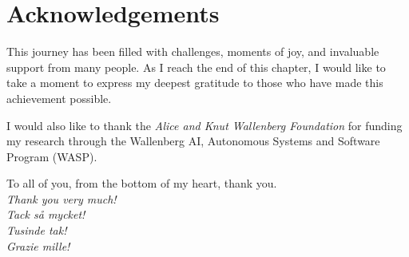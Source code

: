 \chapter{Acknowledgements}
\label{chap:acknowledgements}
This journey has been filled with challenges, moments of joy, and invaluable
support from many people. As I reach the end of this chapter, I would like to
take a moment to express my deepest gratitude to those who have made this
achievement possible.



I would also like to thank the \emph{Alice and Knut Wallenberg Foundation} for funding my
research through the Wallenberg AI, Autonomous Systems and Software Program (WASP).

To all of you, from the bottom of my heart, thank you.\\[1cm]

\hfill \emph{Thank you very much!}\\

\hfill \emph{Tack s\r{a} mycket!}\\

\hfill \emph{Tusinde tak!}\\

\hfill \emph{Grazie mille!}\\
